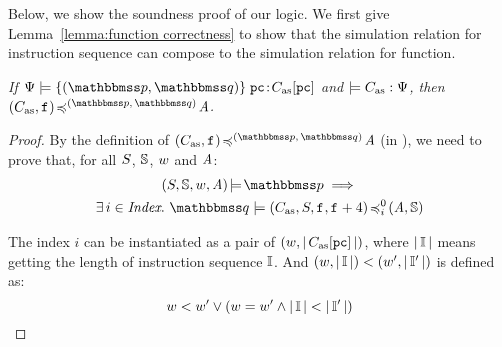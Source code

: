 {\color{blue}
Below, we show the soundness proof of our logic. 
We first give Lemma~\ref{lemma:function correctness} 
to show that the simulation relation for instruction 
sequence can compose to the simulation relation for 
function.
\begin{lemma}
    \label{lemma:function correctness}
    \em
    If $\semwffseqrel{\Cspec{}}{\relastP}{\relastQ}
            {\pc}{\asmimp[\pc]}$ and 
    $\models C_{\text{as}}:\Psi{}$, then 
    $\simFunction{(\asmimp, \lab{})}
        {(\relastP, \, \relastQ)}{\primcom}$.
\end{lemma}
\begin{proof}
    By the definition of 
    $\simFunction{(\asmimp, \lab{})}
        {(\relastP, \, \relastQ)}{\primcom}$
    (in \Def{\ref{def:simfunc}}), 
    we need to prove that, for all $S$, $\mathbb{S}$, 
    $w$ and $\textit{A}$: 
    \begin{multline}
        \asrtmodel{(\state, \hpstate, \word, \primcom)}
            {\relastP} \implies \\
            \exists \, i \in \Index. \
            \simFunctionSt{\relastQ}{(\asmimp, \state, \lab{}, \lab{}+4)}
                {i}{0}{(\primcom, \hpstate)}  
    \end{multline}
    
    The index $i$ can be instantiated as a pair of 
    $(w, |\,C_{\text{as}}[\texttt{pc}]\,|)$, where $|\,\mathbb{I}\,|$ means 
    getting the length of instruction sequence $\mathbb{I}$. 
    And $(w, |\, \mathbb{I} \,|) < (w', |\,\mathbb{I}'\,|)$ 
    is defined as:
    \[
        w < w' \lor
        (w = w' \land 
        |\,\mathbb{I}\,| < |\,\mathbb{I}'\,|)
    \]


\end{proof}}
